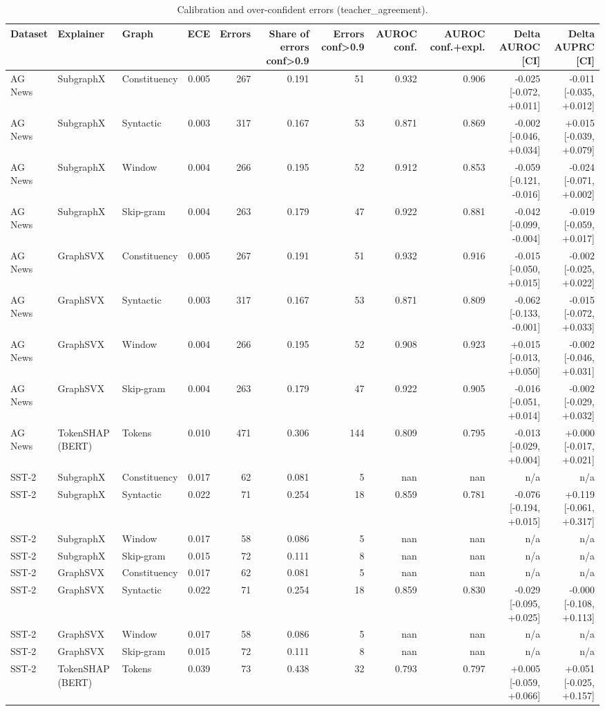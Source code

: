 \begin{table}[H]
\centering
\small
\caption{Calibration and over-confident errors (teacher_agreement).}
\label{tab:regime_teacher_agreement}
\begin{tabular}{lllrrrrrrrr}
\toprule
Dataset & Explainer & Graph & ECE & Errors & Share of errors conf>0.9 & Errors conf>0.9 & AUROC conf. & AUROC conf.+expl. & Delta AUROC [CI] & Delta AUPRC [CI] \\
\midrule
AG News & SubgraphX & Constituency & 0.005 & 267 & 0.191 & 51 & 0.932 & 0.906 & -0.025 [-0.072, +0.011] & -0.011 [-0.035, +0.012] \\
AG News & SubgraphX & Syntactic & 0.003 & 317 & 0.167 & 53 & 0.871 & 0.869 & -0.002 [-0.046, +0.034] & +0.015 [-0.039, +0.079] \\
AG News & SubgraphX & Window & 0.004 & 266 & 0.195 & 52 & 0.912 & 0.853 & -0.059 [-0.121, -0.016] & -0.024 [-0.071, +0.002] \\
AG News & SubgraphX & Skip-gram & 0.004 & 263 & 0.179 & 47 & 0.922 & 0.881 & -0.042 [-0.099, -0.004] & -0.019 [-0.059, +0.017] \\
AG News & GraphSVX & Constituency & 0.005 & 267 & 0.191 & 51 & 0.932 & 0.916 & -0.015 [-0.050, +0.015] & -0.002 [-0.025, +0.022] \\
AG News & GraphSVX & Syntactic & 0.003 & 317 & 0.167 & 53 & 0.871 & 0.809 & -0.062 [-0.133, -0.001] & -0.015 [-0.072, +0.033] \\
AG News & GraphSVX & Window & 0.004 & 266 & 0.195 & 52 & 0.908 & 0.923 & +0.015 [-0.013, +0.050] & -0.002 [-0.046, +0.031] \\
AG News & GraphSVX & Skip-gram & 0.004 & 263 & 0.179 & 47 & 0.922 & 0.905 & -0.016 [-0.051, +0.014] & -0.002 [-0.029, +0.032] \\
AG News & TokenSHAP (BERT) & Tokens & 0.010 & 471 & 0.306 & 144 & 0.809 & 0.795 & -0.013 [-0.029, +0.004] & +0.000 [-0.017, +0.021] \\
SST-2 & SubgraphX & Constituency & 0.017 & 62 & 0.081 & 5 & nan & nan & n/a & n/a \\
SST-2 & SubgraphX & Syntactic & 0.022 & 71 & 0.254 & 18 & 0.859 & 0.781 & -0.076 [-0.194, +0.015] & +0.119 [-0.061, +0.317] \\
SST-2 & SubgraphX & Window & 0.017 & 58 & 0.086 & 5 & nan & nan & n/a & n/a \\
SST-2 & SubgraphX & Skip-gram & 0.015 & 72 & 0.111 & 8 & nan & nan & n/a & n/a \\
SST-2 & GraphSVX & Constituency & 0.017 & 62 & 0.081 & 5 & nan & nan & n/a & n/a \\
SST-2 & GraphSVX & Syntactic & 0.022 & 71 & 0.254 & 18 & 0.859 & 0.830 & -0.029 [-0.095, +0.025] & -0.000 [-0.108, +0.113] \\
SST-2 & GraphSVX & Window & 0.017 & 58 & 0.086 & 5 & nan & nan & n/a & n/a \\
SST-2 & GraphSVX & Skip-gram & 0.015 & 72 & 0.111 & 8 & nan & nan & n/a & n/a \\
SST-2 & TokenSHAP (BERT) & Tokens & 0.039 & 73 & 0.438 & 32 & 0.793 & 0.797 & +0.005 [-0.059, +0.066] & +0.051 [-0.025, +0.157] \\
\bottomrule
\end{tabular}
\end{table}

